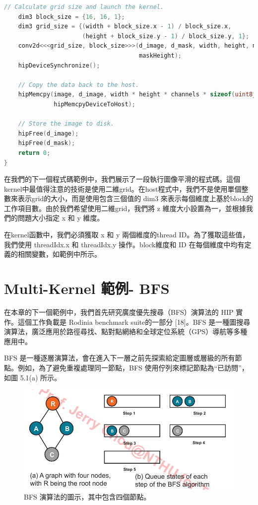 \begin{lstlisting}[language=c++,caption={HIP 平滑運算程式}]
    // Calculate grid size and launch the kernel.
    dim3 block_size = {16, 16, 1};
    dim3 grid_size = {(width + block_size.x - 1) / block_size.x,
                      (height + block_size.y - 1) / block_size.y, 1};
    conv2d<<<grid_size, block_size>>>(d_image, d_mask, width, height, maskWidth,
                                      maskHeight);
    hipDeviceSynchronize();

    // Copy the data back to the host.
    hipMemcpy(image, d_image, width * height * channels * sizeof(uint8_t),
              hipMemcpyDeviceToHost);

    // Store the image to disk.
    hipFree(d_image);
    hipFree(d_mask);
    return 0;
}
\end{lstlisting}

\vspace{1em}
在我們的下一個程式碼範例中，我們展示了一段執行圖像平滑的程式碼。這個kernel中最值得注意的技術是使用二維grid。在host程式中，我們不是使用單個整數來表示grid的大小，而是使用包含三個值的 dim3 來表示每個維度上基於block的工作項目數。由於我們希望使用二維grid，我們將 z 維度大小設置為一，並根據我們的問題大小指定 x 和 y 維度。

\vspace{1em}
在kernel函數中，我們必須獲取 x 和 y 兩個維度的thread ID。為了獲取這些值，我們使用 threadIdx.x 和 threadIdx.y 操作。block維度和 ID 在每個維度中均有定義的相關變數，如範例中所示。

\section{Multi-Kernel 範例- BFS} 
\vspace{1em}
在本章的下一個範例中，我們首先研究廣度優先搜尋（BFS）演算法的 HIP 實作。這個工作負載是 Rodinia
 benchmark suite的一部分 [18]。BFS 是一種圖搜尋演算法，廣泛應用於路徑尋找、點對點網絡和全球定位系統（GPS）導航等多種應用中。

\vspace{1em}
 BFS 是一種逐層演算法，會在進入下一層之前先探索給定圖層或層級的所有節點。例如，為了避免重複處理同一節點，BFS 使用佇列來標記節點為“已訪問”，如圖 5.1(a) 所示。


\begin{figure}
    \centering
    \includegraphics[width=1\linewidth]{FileAusiliari//Screenshots/Figure5-1.png}
    \caption{BFS 演算法的圖示，其中包含四個節點。}
    \label{fig:enter-label}
\end{figure}


